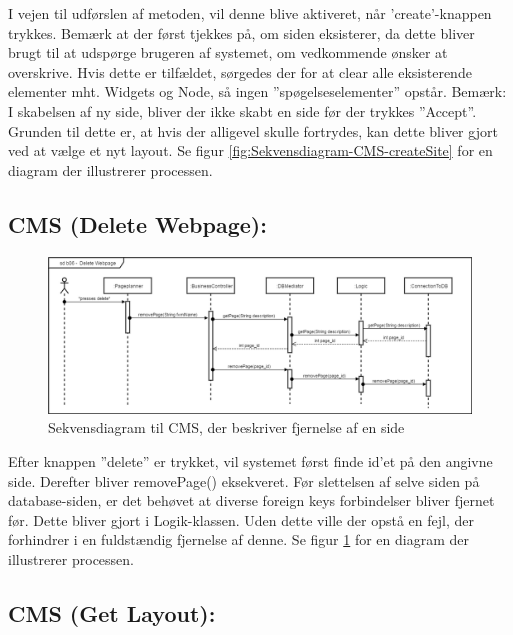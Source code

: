 I vejen til udførslen af metoden, vil denne blive aktiveret, når ’create’-knappen trykkes. Bemærk at der først tjekkes på, om siden eksisterer, da dette bliver brugt til at udspørge brugeren af systemet, om vedkommende ønsker at overskrive. Hvis dette er tilfældet, sørgedes der for at clear alle eksisterende elementer mht. Widgets og Node, så ingen ”spøgelseselementer” opstår.
Bemærk: I skabelsen af ny side, bliver der ikke skabt en side før der trykkes ”Accept”. Grunden til dette er, at hvis der alligevel skulle fortrydes, kan dette bliver gjort ved at vælge et nyt layout. Se figur \ref{fig:Sekvensdiagram-CMS-createSite} for en diagram der illustrerer processen.

\subsection{CMS (Delete Webpage):}

\begin{figure}[H]
  \includegraphics[width=\linewidth]{elaborationsdokumentet/figurer/analyse/Delete_Diagram.png}
  \caption{Sekvensdiagram til CMS, der beskriver fjernelse af en side}
  \label{fig:Sekvensdiagram-CMS-deleteSite}
\end{figure}

Efter knappen ”delete” er trykket, vil systemet først finde id’et på den angivne side. Derefter bliver removePage() eksekveret. Før slettelsen af selve siden på database-siden, er det behøvet at diverse foreign keys forbindelser bliver fjernet før. Dette bliver gjort i Logik-klassen. Uden dette ville der opstå en fejl, der forhindrer i en fuldstændig fjernelse af denne. Se figur \ref{fig:Sekvensdiagram-CMS-deleteSite} for en diagram der illustrerer processen.

\subsection{CMS (Get Layout):}

